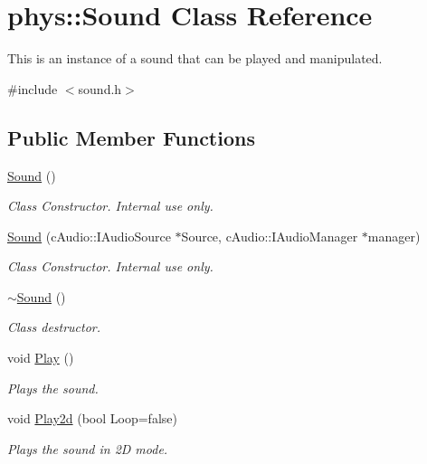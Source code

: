 \hypertarget{classphys_1_1Sound}{
\section{phys::Sound Class Reference}
\label{dc/d2f/classphys_1_1Sound}
}


This is an instance of a sound that can be played and manipulated.  




{\ttfamily \#include $<$sound.h$>$}

\subsection*{Public Member Functions}
\begin{DoxyCompactItemize}
\item 
\hyperlink{classphys_1_1Sound_a6a9d4b475da9453c9b02ca2c49a6fa76}{Sound} ()
\begin{DoxyCompactList}\small\item\em Class Constructor. Internal use only. \item\end{DoxyCompactList}\item 
\hyperlink{classphys_1_1Sound_a0452d6079bcb201f9d2f3b2742eb21b6}{Sound} (cAudio::IAudioSource $\ast$Source, cAudio::IAudioManager $\ast$manager)
\begin{DoxyCompactList}\small\item\em Class Constructor. Internal use only. \item\end{DoxyCompactList}\item 
\hyperlink{classphys_1_1Sound_ad49df56479e003d0990a5dcb1c506d39}{$\sim$Sound} ()
\begin{DoxyCompactList}\small\item\em Class destructor. \item\end{DoxyCompactList}\item 
void \hyperlink{classphys_1_1Sound_ae7caa90deb9e5a4cab2d5ada27f5e5b5}{Play} ()
\begin{DoxyCompactList}\small\item\em Plays the sound. \item\end{DoxyCompactList}\item 
void \hyperlink{classphys_1_1Sound_a853bb9a2c1b41cd82a385608614861e7}{Play2d} (bool Loop=false)
\begin{DoxyCompactList}\small\item\em Plays the sound in 2D mode. \item\end{DoxyCompactList}\item 

\end{DoxyCompactItemize}
